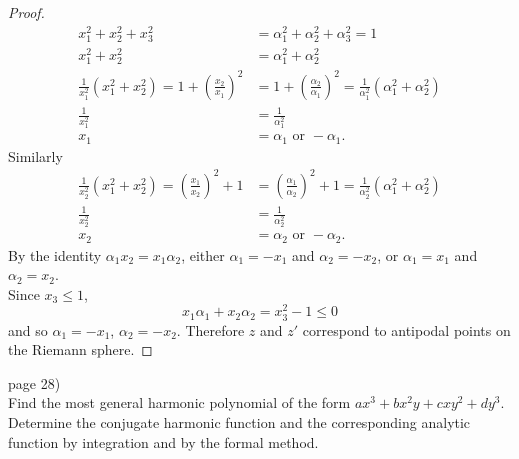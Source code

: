 \documentclass{article}
\newenvironment{problem}[2][Problem]{\begin{trivlist}
\item[\hskip \labelsep {\bfseries #1}\hskip \labelsep {\bfseries #2.}]}{\end{trivlist}}
\begin{document}
\begin{proof}
\begin{align*}
    x_1^2 + x_2^2 + x_3^2 &= \alpha_1^2 + \alpha_2^2 + \alpha_3^2 = 1\\
    x_1^2 + x_2^2 &= \alpha_1^2 + \alpha_2^2 \\
    \frac{1}{x_1^2}(x_1^2 + x_2^2)
      = 1 + \left(\frac{x_2}{x_1}\right)^2
      &= 1 + \left(\frac{\alpha_2}{\alpha_1}\right)^2
      = \frac{1}{\alpha_1^2}(\alpha_1^2 + \alpha_2^2) \\
    \frac{1}{x_1^2} &= \frac{1}{\alpha_1^2} \\
    x_1 &= \alpha_1 \text { or } -\alpha_1.
  \end{align*} Similarly \begin{align*}
  \frac{1}{x_2^2}(x_1^2 + x_2^2)
    = \left(\frac{x_1}{x_2}\right)^2 + 1
    &= \left(\frac{\alpha_1}{\alpha_2}\right)^2 + 1
    = \frac{1}{\alpha_2^2}(\alpha_1^2 + \alpha_2^2) \\
    \frac{1}{x_2^2} &= \frac{1}{\alpha_2^2} \\
    x_2 &= \alpha_2 \text{ or } -\alpha_2.
  \end{align*}
  By the identity $\alpha_1 x_2 = x_1 \alpha_2$,
  either $\alpha_1 = -x_1$ and $\alpha_2 = -x_2$,
  or $\alpha_1 = x_1$ and $\alpha_2 = x_2$.\\
  Since $x_3 \leq 1$, \[
    x_1\alpha_1 + x_2\alpha_2 = x_3^2 - 1 \leq 0
  \] and so $\alpha_1 = -x_1$, $\alpha_2 = -x_2$. Therefore $z$ and $z'$
  correspond to antipodal points on the Riemann sphere.
\end{proof}

\pagebreak

\begin{problem}{3} (page 28) \\
  Find the most general harmonic polynomial of the form
  $ax^3 + bx^2y + cxy^2 + dy^3$.
  Determine the conjugate harmonic function and the corresponding analytic
  function by integration and by the formal method.
\end{problem}
\end{document}
